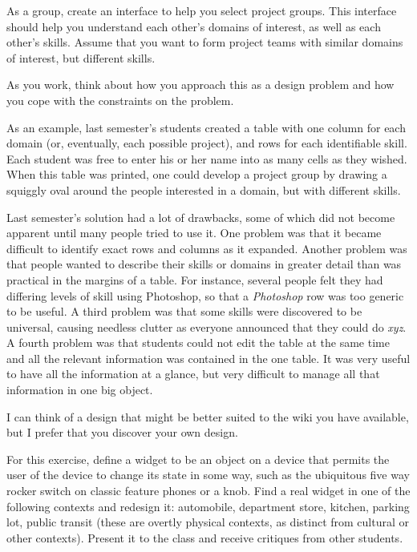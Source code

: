 \hypertarget{identify-domains-and-skills}{%
\label{identify-domains-and-skills}}

As a group, create an interface to help you select project groups. This
interface should help you understand each other's domains of interest,
as well as each other's skills. Assume that you want to form project
teams with similar domains of interest, but different skills.

As you work, think about how you approach this as a design problem and
how you cope with the constraints on the problem.

As an example, last semester's students created a table with one column
for each domain (or, eventually, each possible project), and rows for
each identifiable skill. Each student was free to enter his or her name
into as many cells as they wished. When this table was printed, one
could develop a project group by drawing a squiggly oval around the
people interested in a domain, but with different skills.

Last semester's solution had a lot of drawbacks, some of which did not
become apparent until many people tried to use it. One problem was that
it became difficult to identify exact rows and columns as it expanded.
Another problem was that people wanted to describe their skills or
domains in greater detail than was practical in the margins of a table.
For instance, several people felt they had differing levels of skill
using Photoshop, so that a \emph{Photoshop} row was too generic to be
useful. A third problem was that some skills were discovered to be
universal, causing needless clutter as everyone announced that they
could do \emph{xyz}. A fourth problem was that students could not edit
the table at the same time and all the relevant information was
contained in the one table. It was very useful to have all the
information at a glance, but very difficult to manage all that
information in one big object.

I can think of a design that might be better suited to the wiki you have
available, but I prefer that you discover your own design.

\hypertarget{widget-redesign}{%
\label{widget-redesign}}

For this exercise, define a widget to be an object on a device that
permits the user of the device to change its state in some way, such as
the ubiquitous five way rocker switch on classic feature phones or a
knob. Find a real widget in one of the following contexts and redesign
it: automobile, department store, kitchen, parking lot, public transit
(these are overtly physical contexts, as distinct from cultural or other
contexts). Present it to the class and receive critiques from other
students.

